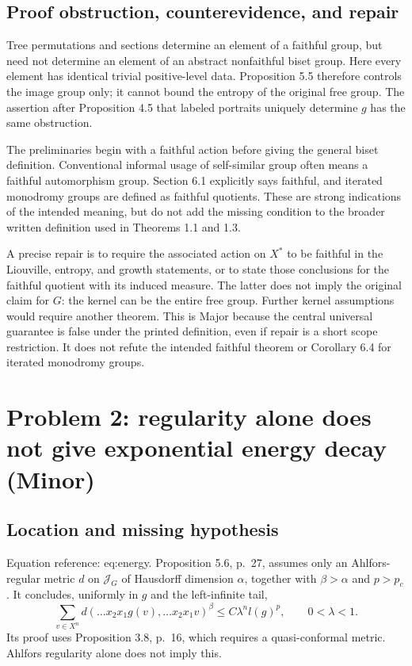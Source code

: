 \documentclass[10pt]{article}
\begin{document}
\subsection*{Proof obstruction, counterevidence, and repair}
Tree permutations and sections determine an element of a faithful group, but need not determine an element of an abstract nonfaithful biset group. Here every element has identical trivial positive-level data. Proposition 5.5 therefore controls the image group only; it cannot bound the entropy of the original free group. The assertion after Proposition 4.5 that labeled portraits uniquely determine \(g\) has the same obstruction.\par
The preliminaries begin with a faithful action before giving the general biset definition. Conventional informal usage of self-similar group often means a faithful automorphism group. Section 6.1 explicitly says faithful, and iterated monodromy groups are defined as faithful quotients. These are strong indications of the intended meaning, but do not add the missing condition to the broader written definition used in Theorems 1.1 and 1.3.\par
A precise repair is to require the associated action on \(X^*\) to be faithful in the Liouville, entropy, and growth statements, or to state those conclusions for the faithful quotient with its induced measure. The latter does not imply the original claim for \(G\): the kernel can be the entire free group. Further kernel assumptions would require another theorem. This is Major because the central universal guarantee is false under the printed definition, even if repair is a short scope restriction. It does not refute the intended faithful theorem or Corollary 6.4 for iterated monodromy groups.\par
\section*{Problem 2: regularity alone does not give exponential energy decay (Minor)}
\subsection*{Location and missing hypothesis}
Equation reference: eq:energy. Proposition 5.6, p. 27, assumes only an Ahlfors-regular metric \(d\) on \(\mathcal J_G\) of Hausdorff dimension \(\alpha\), together with \(\beta>\alpha\) and \(p>p_c\). It concludes, uniformly in \(g\) and the left-infinite tail, \[
 \sum_{v\in X^n}d(\ldots x_2x_1g(v),\ldots x_2x_1v)^\beta
 \le C\lambda^n l(g)^p,\qquad 0<\lambda<1.\] Its proof uses Proposition 3.8, p. 16, which requires a quasi-conformal metric. Ahlfors regularity alone does not imply this.\par
\end{document}
